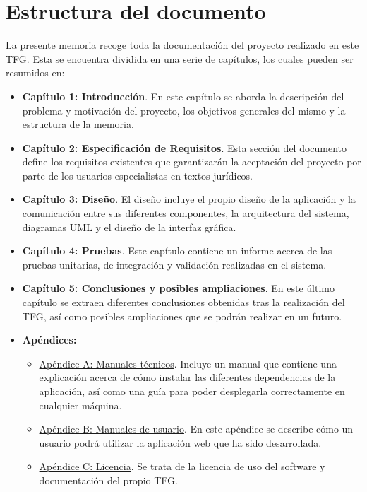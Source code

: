 \section{Estructura del documento}
La presente memoria recoge toda la documentación del proyecto realizado en este TFG. Esta se encuentra dividida en una serie de capítulos, los cuales pueden ser resumidos en:
\begin{itemize}
\item {\bf Capítulo 1: Introducción}. En este capítulo se aborda la descripción del problema y motivación del proyecto, los objetivos generales del mismo y la estructura de la memoria.
\item {\bf Capítulo 2: Especificación de Requisitos}. Esta sección del documento define los requisitos existentes que garantizarán la aceptación del proyecto por parte de los usuarios especialistas en textos jurídicos.
\item {\bf Capítulo 3: Diseño}. El diseño incluye el propio diseño de la aplicación y la comunicación entre sus diferentes componentes, la arquitectura del sistema, diagramas UML y el diseño de la interfaz gráfica.
\item {\bf Capítulo 4: Pruebas}. Este capítulo contiene un informe acerca de las pruebas unitarias, de integración y validación realizadas en el sistema.
\item {\bf Capítulo 5: Conclusiones y posibles ampliaciones}. En este último capítulo se extraen diferentes conclusiones obtenidas tras la realización del TFG, así como posibles ampliaciones que se podrán realizar en un futuro.
\item {\bf Apéndices:}
\begin{itemize}
\item \underline{Apéndice A: Manuales técnicos}. Incluye un manual que contiene una explicación acerca de cómo instalar las diferentes dependencias de la aplicación, así como una guía para poder desplegarla correctamente en cualquier máquina.
\item \underline{Apéndice B: Manuales de usuario}. En este apéndice se describe cómo un usuario podrá utilizar la aplicación web que ha sido desarrollada.
\item \underline{Apéndice C: Licencia}. Se trata de la licencia de uso del software y documentación del propio TFG.
\end{itemize}
\end{itemize}